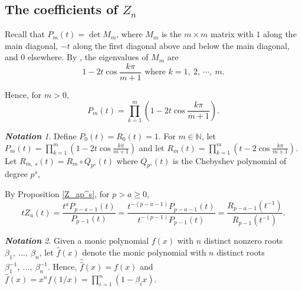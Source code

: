 \documentclass[11 pt]{amsart}
\theoremstyle{plain}
\theoremstyle{definition}
\theoremstyle{remark}
\newtheorem*{notation}{{\bf Notation}}
\def\N{\mathbb{N}}
\def\l{\lambda}
\begin{document}

\subsection{The coefficients of $Z_n$}



    Recall that $P_m(t)=\det M_m$, where $M_m$ is the $m\times m$ matrix  with $1$ along the main diagonal, $-t$ along the first diagonal above and below the main diagonal, and $0$ elsewhere. By \cite{kulkarni1999eigenvalues}, 
    the eigenvalues of $M_m$ are $$1- 2t\cos \frac{k\pi}{m+1} \text{ where $k=1,\ 2,\ \cdots,\ m$.}$$
    
    
    Hence, for $m>0$, $$P_m(t)= \prod_{k=1}^m (1- 2t\cos \frac{k\pi}{m+1}).$$



\begin{notation}
    Define $P_0(t)=R_0(t)=1$. For $m \in \N$, let $P_m(t)= \prod_{k=1}^m (1- 2t\cos \frac{k\pi}{m+1})$ and let $R_m(t)=\prod^m_{k=1}(t-2 \cos \frac{k \pi}{m+1}).$  Let $R_{m,\ s}(t)=R_m \circ Q_{p^s}(t)$ where $Q_{p^s}(t)$ is the Chebyshev polynomial of degree $p^s$,
\end{notation}

By Proposition \ref{Z_ap^s}, for $p>a\ge0$,  $$tZ_a(t)=\frac{t^aP_{p-a-1}(t)}{P_{p-1}(t)}=\frac{t^{-(p-a-1)}P_{p-a-1}(t)}{t^{-(p-1)}P_{p-1}(t)}= \frac{R_{p-a-1}(t^{-1})}{R_{p-1}(t^{-1})}.$$

\begin{notation}
Given a monic polynomial $f(x)$ with $n$ distinct nonzero roots $\beta_1,\ \ldots,\  \beta_n$, let $\hat{f}(x)$ denote the monic polynomial with $n$ distinct roots $\beta_1^{-1},\ \ldots,\ \beta_n^{-1}.$ Hence, $\hat{\hat{f}}(x)=f(x)$ and $\hat{f}(x)=x^nf(1/x)=\prod_{i=1}^n (1-\beta_i x).$    
\end{notation}
\end{document}
